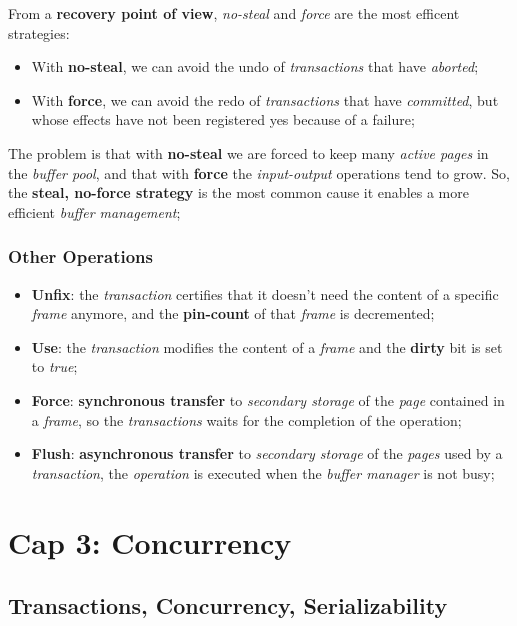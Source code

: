 \documentclass{article}
\begin{document}
From a \textbf{recovery point of view}, \emph{no-steal} and \emph{force} are the most efficent strategies:
\begin{itemize}
\item With\textbf{ no-steal}, we can avoid the undo of \emph{transactions} that have \emph{aborted};
\item With \textbf{force}, we can avoid the redo of \emph{transactions} that have \emph{committed}, but whose effects have not been registered yes because of a failure;
\end{itemize}
The problem is that with \textbf{no-steal} we are forced to keep many \emph{active pages} in the \emph{buffer pool}, and that with \textbf{force} the \emph{input-output} operations tend to grow. So, the\textbf{ steal, no-force strategy} is the most common cause it enables a more efficient \emph{buffer management};
\subsubsection{Other Operations}
\begin{itemize}
\item \textbf{Unfix}: the \emph{transaction} certifies that it doesn't need the content of a specific \emph{frame} anymore, and the\textbf{ pin-count} of that \emph{frame} is decremented;
\item \textbf{Use}: the \emph{transaction} modifies the content of a \emph{frame} and the \textbf{dirty} bit is set to \emph{true};
\item \textbf{Force}: \textbf{synchronous transfer} to \emph{secondary storage} of the \emph{page} contained in a \emph{frame}, so the \emph{transactions} waits for the completion of the operation;
\item \textbf{Flush}: \textbf{asynchronous transfer} to \emph{secondary storage} of the \emph{pages} used by a \emph{transaction}, the \emph{operation} is executed when the \emph{buffer manager} is not busy;
\end{itemize}
\section{Cap 3: Concurrency}
\subsection{Transactions, Concurrency, Serializability}
\end{document}
